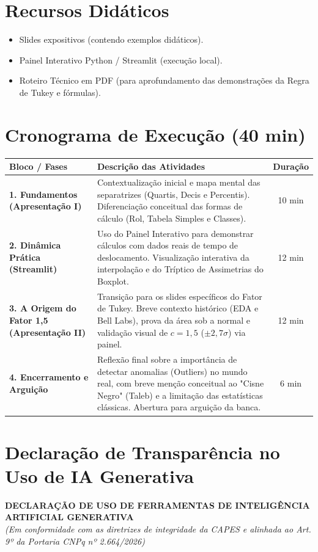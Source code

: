 \documentclass[12pt,a4paper]{article}
\begin{document}
\section{Recursos Didáticos}
\begin{itemize}
    \item Slides expositivos (contendo exemplos didáticos).
    \item Painel Interativo Python / Streamlit (execução local).
    \item Roteiro Técnico em PDF (para aprofundamento das demonstrações da Regra de Tukey e fórmulas).
\end{itemize}

\section{Cronograma de Execução (40 min)}
\begin{table}[h]
\centering
\begin{tabular}{@{}p{3.5cm}p{9.5cm}c@{}}
\toprule
\textbf{Bloco / Fases} & \textbf{Descrição das Atividades} & \textbf{Duração} \\ \midrule
\textbf{1. Fundamentos (Apresentação I)} & Contextualização inicial e mapa mental das separatrizes (Quartis, Decis e Percentis). Diferenciação conceitual das formas de cálculo (Rol, Tabela Simples e Classes). & 10 min \\ 
\addlinespace
\textbf{2. Dinâmica Prática (Streamlit)} & Uso do Painel Interativo para demonstrar cálculos com dados reais de tempo de deslocamento. Visualização interativa da interpolação e do Tríptico de Assimetrias do Boxplot. & 12 min \\ 
\addlinespace
\textbf{3. A Origem do Fator 1,5 (Apresentação II)} & Transição para os slides específicos do Fator de Tukey. Breve contexto histórico (EDA e Bell Labs), prova da área sob a normal e validação visual de $c=1,5$ ($\pm 2,7\sigma$) via painel. & 12 min \\ 
\addlinespace
\textbf{4. Encerramento e Arguição} & Reflexão final sobre a importância de detectar anomalias (Outliers) no mundo real, com breve menção conceitual ao "Cisne Negro" (Taleb) e a limitação das estatísticas clássicas. Abertura para arguição da banca. & 6 min \\ \bottomrule
\end{tabular}
\end{table}

\section{Declaração de Transparência no Uso de IA Generativa}
\noindent \textbf{DECLARAÇÃO DE USO DE FERRAMENTAS DE INTELIGÊNCIA ARTIFICIAL GENERATIVA} \\
\textit{(Em conformidade com as diretrizes de integridade da CAPES e alinhada ao Art. 9º da Portaria CNPq nº 2.664/2026)}
\end{document}
